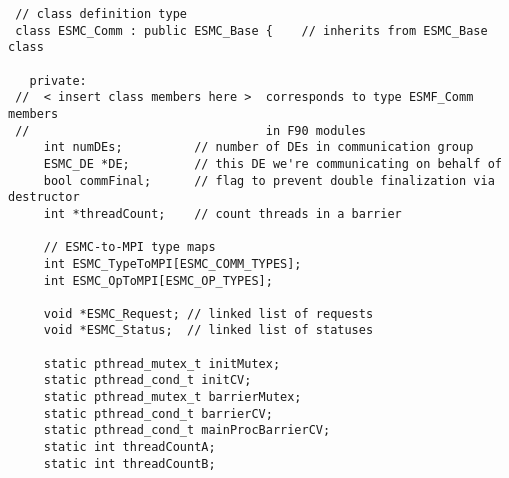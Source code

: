 
\begin{verbatim}
 // class definition type
 class ESMC_Comm : public ESMC_Base {    // inherits from ESMC_Base class

   private:
 //  < insert class members here >  corresponds to type ESMF_Comm members
 //                                 in F90 modules
     int numDEs;          // number of DEs in communication group
     ESMC_DE *DE;         // this DE we're communicating on behalf of
     bool commFinal;      // flag to prevent double finalization via destructor
     int *threadCount;    // count threads in a barrier

     // ESMC-to-MPI type maps
     int ESMC_TypeToMPI[ESMC_COMM_TYPES];
     int ESMC_OpToMPI[ESMC_OP_TYPES];

     void *ESMC_Request; // linked list of requests
     void *ESMC_Status;  // linked list of statuses

     static pthread_mutex_t initMutex;
     static pthread_cond_t initCV;
     static pthread_mutex_t barrierMutex;
     static pthread_cond_t barrierCV;
     static pthread_cond_t mainProcBarrierCV;
     static int threadCountA;
     static int threadCountB;
\end{verbatim}
